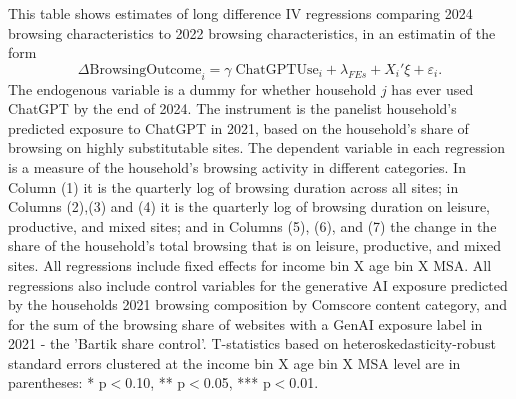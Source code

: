 \documentclass[12pt]{article}
\begin{document}
\begin{table}[htbp]
\caption{\\ \centering \textbf{Effect of ChatGPT adoption on browsing activity by Age}}  

\setlength{\abovedisplayskip}{0pt}
\setlength{\belowdisplayskip}{0.5pt}
\setlength{\abovedisplayshortskip}{0pt}
\setlength{\belowdisplayshortskip}{0.5pt}
\vspace{-0.1cm} \label{table:2sls-bycat-byage} \footnotesize  This table shows estimates of long difference IV regressions comparing 2024 browsing characteristics to 2022 browsing characteristics, in an estimatin of the form
$$\Delta\text{BrowsingOutcome}_{i} = \gamma\; \text{ChatGPTUse}_{i}  + \lambda_{FEs} + X_i'\xi + \varepsilon_{i}.$$
The endogenous variable is a dummy for whether household $j$ has ever used ChatGPT by the end of 2024. The instrument is the panelist household's predicted exposure to ChatGPT in 2021, based on the household's share of browsing on highly substitutable sites. The dependent variable in each regression is a measure of the household's browsing activity in different categories. In Column (1) it is the quarterly log of browsing duration across all sites; in Columns (2),(3) and (4) it is the quarterly log of browsing duration on  leisure, productive, and mixed sites; and in Columns (5), (6), and (7) the change in the share of the household's total browsing that is  on  leisure, productive, and mixed sites. All regressions include fixed effects for income bin X age bin X MSA. All regressions also include control variables for the generative AI exposure predicted by the households 2021 browsing composition by Comscore content category, and for the sum of the browsing share of websites with a GenAI exposure label in 2021 - the 'Bartik share control'. T-statistics based on heteroskedasticity-robust standard errors clustered at the income bin X age bin X MSA level are in parentheses: * p$<$0.10, ** p$<$0.05, *** p$<$0.01.  \vspace{0.1cm}


\end{table}
\end{document}
